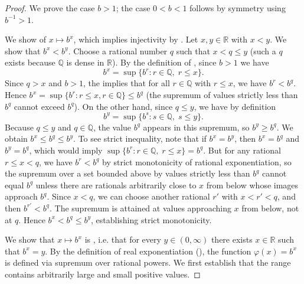 \begin{proof}
    We prove the case $b > 1$; the case $0 < b < 1$ follows by symmetry using $b^{-1} > 1$.

    We show  of $x \mapsto b^x$, which implies injectivity by . Let $x, y \in \mathbb{R}$ with $x < y$. We show that $b^x < b^y$. Choose a rational number $q$ such that $x < q \leq y$ (such a $q$ exists because $\mathbb{Q}$ is dense in $\mathbb{R}$). By the definition of , since $b > 1$ we have
    $$b^x = \sup\{ b^r : r \in \mathbb{Q},\; r \leq x \}.$$
    Since $q > x$ and $b > 1$, the  implies that for all $r \in \mathbb{Q}$ with $r \leq x$, we have $b^r < b^q$. Hence $b^x = \sup\{ b^r : r \leq x, r \in \mathbb{Q} \} \leq b^q$ (the supremum of values strictly less than $b^q$ cannot exceed $b^q$). On the other hand, since $q \leq y$, we have by definition
    $$b^y = \sup\{ b^s : s \in \mathbb{Q},\; s \leq y \}.$$
    Because $q \leq y$ and $q \in \mathbb{Q}$, the value $b^q$ appears in this supremum, so $b^y \geq b^q$. We obtain $b^x \leq b^q \leq b^y$. To see strict inequality, note that if $b^x = b^y$, then $b^x = b^q$ and $b^y = b^q$, which would imply $\sup\{ b^r : r \in \mathbb{Q},\; r \leq x \} = b^q$. But for any rational $r \leq x < q$, we have $b^r < b^q$ by strict monotonicity of rational exponentiation, so the supremum over a set bounded above by values strictly less than $b^q$ cannot equal $b^q$ unless there are rationals arbitrarily close to $x$ from below whose images approach $b^q$. Since $x < q$, we can choose another rational $r'$ with $x < r' < q$, and then $b^{r'} < b^q$. The supremum is attained at values approaching $x$ from below, not at $q$. Hence $b^x < b^q \leq b^y$, establishing strict monotonicity.

    We show that $x \mapsto b^x$ is , i.e. that for every $y \in (0, \infty)$ there exists $x \in \mathbb{R}$ such that $b^x = y$. By the definition of real exponentiation (), the function $\varphi(x) = b^x$ is defined via supremum over rational powers. We first establish that the range contains arbitrarily large and small positive values.


\end{proof}
